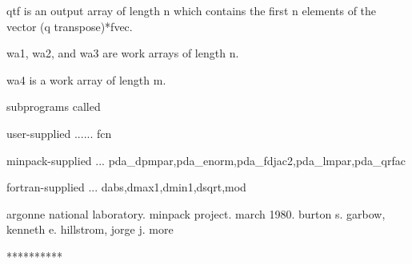 \documentclass[11pt,twoside,nolof]{starlink}
\begin{document}
\begin{terminalv}
       qtf is an output array of length n which contains
         the first n elements of the vector (q transpose)*fvec.

       wa1, wa2, and wa3 are work arrays of length n.

       wa4 is a work array of length m.

     subprograms called

       user-supplied ...... fcn

       minpack-supplied ... pda_dpmpar,pda_enorm,pda_fdjac2,pda_lmpar,pda_qrfac

       fortran-supplied ... dabs,dmax1,dmin1,dsqrt,mod

     argonne national laboratory. minpack project. march 1980.
     burton s. garbow, kenneth e. hillstrom, jorge j. more

     **********
\end{terminalv}


\end{document}
